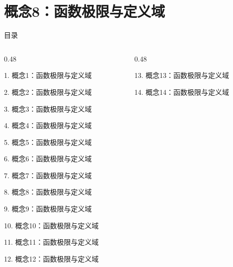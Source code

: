 \documentclass[aspectratio=169,10pt,fontset=fandol]{ctexbeamer}
\begin{document}
\section{概念8：函数极限与定义域}
\begin{frame}[t,fragile]{目录}
\small
\begin{columns}[T,onlytextwidth]
\begin{column}{0.48\textwidth}
{\color{black}\small 1. 概念1：函数极限与定义域\par}\vspace{0.22em}
{\color{black}\small 2. 概念2：函数极限与定义域\par}\vspace{0.22em}
{\color{black}\small 3. 概念3：函数极限与定义域\par}\vspace{0.22em}
{\color{black}\small 4. 概念4：函数极限与定义域\par}\vspace{0.22em}
{\color{black}\small 5. 概念5：函数极限与定义域\par}\vspace{0.22em}
{\color{black}\small 6. 概念6：函数极限与定义域\par}\vspace{0.22em}
{\color{black}\small 7. 概念7：函数极限与定义域\par}\vspace{0.22em}
{\color{blue}\small 8. 概念8：函数极限与定义域\par}\vspace{0.22em}
{\color{gray!40}\small 9. 概念9：函数极限与定义域\par}\vspace{0.22em}
{\color{gray!40}\small 10. 概念10：函数极限与定义域\par}\vspace{0.22em}
{\color{gray!40}\small 11. 概念11：函数极限与定义域\par}\vspace{0.22em}
{\color{gray!40}\small 12. 概念12：函数极限与定义域\par}\vspace{0.22em}
\end{column}
\begin{column}{0.48\textwidth}
{\color{gray!40}\small 13. 概念13：函数极限与定义域\par}\vspace{0.22em}
{\color{gray!40}\small 14. 概念14：函数极限与定义域\par}\vspace{0.22em}

\end{column}
\end{columns}
\end{frame}
\end{document}
